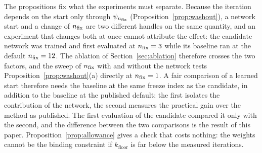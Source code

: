 The propositions fix what the experiments must separate. Because the iteration depends on the start only through $\psi_{n_{\mathrm{fix}}}$ (Proposition~\ref{prop:washout}), a network start and a change of $n_{\mathrm{fix}}$ are two different handles on the same quantity, and an experiment that changes both at once cannot attribute the effect: the candidate network was trained and first evaluated at $n_{\mathrm{fix}}=3$ while its baseline ran at the default $n_{\mathrm{fix}}=12$. The ablation of Section~\ref{sec:ablation} therefore crosses the two factors, and the sweep of $n_{\mathrm{fix}}$ with
and without the network tests Proposition~\ref{prop:washout}(a) directly at $n_{\mathrm{fix}}=1$. A fair comparison of a learned start therefore needs the baseline at the same freeze index as the candidate, in addition to the baseline at the published default: the first isolates the contribution of the network, the second measures the practical gain over the method as published. The first evaluation of the candidate compared it only with the second, and the difference between the two comparisons is the result of this paper. Proposition~\ref{prop:allowance} gives a check that costs nothing: the weights cannot be the binding constraint if $k_{\mathrm{floor}}$ is far below the measured iterations.

